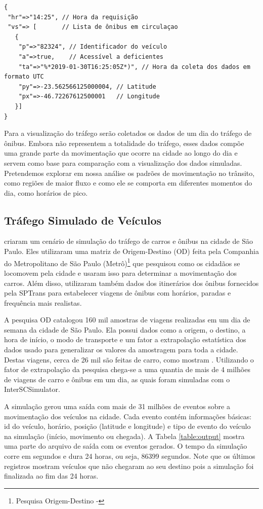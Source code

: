 \begin{lstlisting}[style=myxml, caption={Parte da resposta obitida para a linha 2023}, label=olhovivo.json]
{
 "hr"=>"14:25", // Hora da requisição
 "vs"=> [       // Lista de ônibus em circulaçao
   {
    "p"=>"82324", // Identificador do veículo
    "a"=>true,    // Acessível a deficientes
    "ta"=>"%*2019-01-30T16:25:05Z*)", // Hora da coleta dos dados em formato UTC
    "py"=>-23.562566125000004, // Latitude
    "px"=>-46.72267612500001   // Longitude
   }]
}
\end{lstlisting}

Para a visualização do tráfego serão coletados os dados de um dia do tráfego de
ônibus. Embora não representem a totalidade do tráfego, esses dados compõe uma
grande parte da movimentação que ocorre na cidade ao longo do dia e servem como
base para comparação com a visualização dos dados simuladas. Pretendemos
explorar em nossa análise os padrões de movimentação no trânsito, como regiões
de maior fluxo e como ele se comporta em diferentes momentos do dia, como
horários de pico.

\subsection{Tráfego Simulado de Veículos}
 \citet{santana2018courb} criaram um cenário de simulação do tráfego de carros
e ônibus na cidade de São Paulo. Eles utilizaram uma matriz de Origem-Destino
(OD) feita pela Companhia do Metropolitano de São Paulo
(Metrô)\footnote{Pesquisa Origem-Destino - } que pesquisou
como os cidadãos se locomovem pela cidade e usaram isso para determinar a
movimentação dos carros. Além disso, utilizaram também dados dos
itinerários dos ônibus fornecidos pela SPTrans para estabelecer viagens de
ônibus com horários, paradas e frequência mais realistas.

  A pesquisa OD catalogou 160 mil amostras de viagens realizadas em um dia de
semana da cidade de São Paulo. Ela possui dados como a origem, o destino, a hora
de início, o modo de transporte e um fator a extrapolação estatística dos dados
usado para generalizar os valores da amostragem para toda a cidade.
Destas viagens, cerca de 26 mil são feitas de carro, como mostram
\citet{santana2018courb}. Utilizando o fator de extrapolação da pesquisa
chega-se a uma quantia de mais de 4 milhões de viagens de carro e ônibus em um
dia, as quais foram simuladas com o InterSCSimulator.

  A simulação gerou uma saída com mais de 31 milhões de eventos sobre a
movimentação dos veículos na cidade.  Cada evento contém informações básicas:
id do veículo, horário, posição (latitude e longitude) e tipo de evento do
veículo na simulação (início, movimento ou chegada). A Tabela
\ref{table:output} mostra uma parte do arquivo de saída com os eventos gerados.
O tempo da simulação corre em segundos e dura 24 horas, ou seja, 86399
segundos.  Note que os últimos registros mostram veículos que não chegaram ao
seu destino pois a simulação foi finalizada ao fim das 24 horas.

